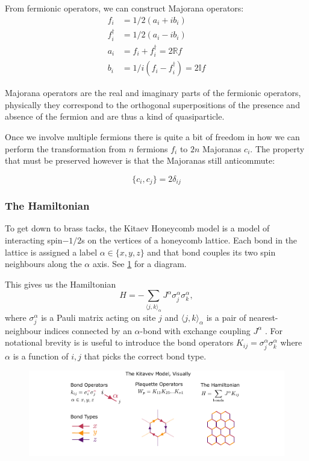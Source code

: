From fermionic operators, we can construct Majorana operators:
\[\begin{aligned}
f_i         &= 1/2 (a_i + ib_i)\\
f^\dagger_i &= 1/2(a_i - ib_i)\\
a_i         &= f_i + f^\dagger_i = 2\mathbb{R}f\\
b_i         &= 1/i(f_i - f^\dagger_i) = 2\mathbb{I} f 
\end{aligned}\]

Majorana operators are the real and imaginary parts of the fermionic
operators, physically they correspond to the orthogonal superpositions
of the presence and absence of the fermion and are thus a kind of
quasiparticle.

Once we involve multiple fermions there is quite a bit of freedom in how
we can perform the transformation from \(n\) fermions \(f_i\) to \(2n\)
Majoranas \(c_i\). The property that must be preserved however is that
the Majoranas still anticommute:

\[ \{c_i, c_j\} = 2\delta_{ij}\]

\hypertarget{the-hamiltonian}{%
\subsubsection{The Hamiltonian}\label{the-hamiltonian}}

To get down to brass tacks, the Kitaev Honeycomb model is a model of
interacting spin\(-1/2\)s on the vertices of a honeycomb lattice. Each
bond in the lattice is assigned a label \(\alpha \in \{ x, y, z\}\) and
that bond couples its two spin neighbours along the \(\alpha\) axis. See
\cref{fig:visual_kitaev_1} for a diagram.

This gives us the Hamiltonian
\[H =  - \sum_{\langle j,k\rangle_\alpha} J^{\alpha}\sigma_j^{\alpha}\sigma_k^{\alpha},\]
where \(\sigma^\alpha_j\) is a Pauli matrix acting on site \(j\) and
\(\langle j,k\rangle_\alpha\) is a pair of nearest-neighbour indices
connected by an \(\alpha\)-bond with exchange coupling \(J^\alpha\)
\textcite{kitaevAnyonsExactlySolved2006}. For notational brevity is is
useful to introduce the bond operators
\(K_{ij} = \sigma_j^{\alpha}\sigma_k^{\alpha}\) where \(\alpha\) is a
function of \(i,j\) that picks the correct bond type.

\begin{figure}
\hypertarget{fig:visual_kitaev_1}{%
\centering
\includegraphics[width=1\textwidth,height=\textheight]{figure_code/amk_chapter/visual_kitaev_1.pdf}
\caption{}\label{fig:visual_kitaev_1}
}
\end{figure}


